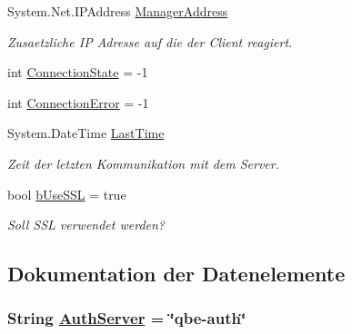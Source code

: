 \begin{CompactItemize}
System.Net.IPAddress \hyperlink{classQbeSAS_1_1HttpService_1_1ServiceDataType_QbeSAS_1_1HttpService_1_1ServiceDataTypeo6}{Manager\-Address}
\begin{CompactList}\small\item\em Zusaetzliche IP Adresse auf die der Client reagiert. \item\end{CompactList}\item 
int \hyperlink{classQbeSAS_1_1HttpService_1_1ServiceDataType_QbeSAS_1_1HttpService_1_1ServiceDataTypeo7}{Connection\-State} = -1
\item 
int \hyperlink{classQbeSAS_1_1HttpService_1_1ServiceDataType_QbeSAS_1_1HttpService_1_1ServiceDataTypeo8}{Connection\-Error} = -1
\item 
System.Date\-Time \hyperlink{classQbeSAS_1_1HttpService_1_1ServiceDataType_QbeSAS_1_1HttpService_1_1ServiceDataTypeo9}{Last\-Time}
\begin{CompactList}\small\item\em Zeit der letzten Kommunikation mit dem Server. \item\end{CompactList}\item 
bool \hyperlink{classQbeSAS_1_1HttpService_1_1ServiceDataType_QbeSAS_1_1HttpService_1_1ServiceDataTypeo10}{b\-Use\-SSL} = true
\begin{CompactList}\small\item\em Soll SSL verwendet werden? \item\end{CompactList}\end{CompactItemize}


\subsection{Dokumentation der Datenelemente}
\hypertarget{classQbeSAS_1_1HttpService_1_1ServiceDataType_QbeSAS_1_1HttpService_1_1ServiceDataTypeo2}{
\subsubsection[AuthServer]{\setlength{\rightskip}{0pt plus 5cm}String \hyperlink{classQbeSAS_1_1HttpService_1_1ServiceDataType_QbeSAS_1_1HttpService_1_1ServiceDataTypeo2}{Auth\-Server} = \char`\"{}qbe-auth\char`\"{}}}
\label{classQbeSAS_1_1HttpService_1_1ServiceDataType_QbeSAS_1_1HttpService_1_1ServiceDataTypeo2}


